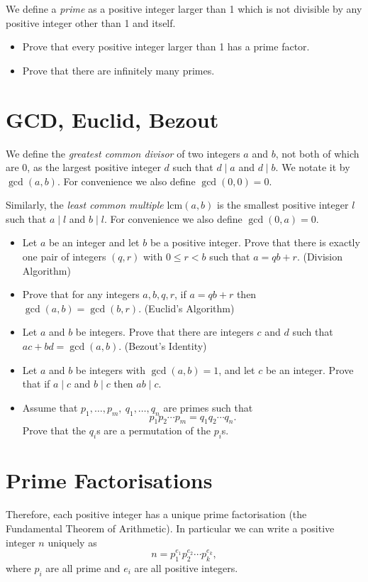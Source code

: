 \documentclass{article}
\begin{document}
We define a \emph{prime} as a positive integer larger than 1 which is not
divisible by any positive integer other than 1 and itself.
\begin{itemize}
	\item Prove that every positive integer larger than 1 has a prime factor.
	\item Prove that there are infinitely many primes.
\end{itemize}
\section{GCD, Euclid, Bezout}
We define the \emph{greatest common divisor} of two integers $a$ and $b$, not
both of which are 0, as the largest positive integer $d$ such that $d\mid a$
and $d\mid b$. We notate it by $\gcd(a,b)$. For convenience we also define
$\gcd(0,0)=0$.

Similarly, the \emph{least common multiple} $\mathrm{lcm}(a,b)$ is the
smallest positive integer $l$ such that $a\mid l$ and $b\mid l$. For
convenience we also define $\gcd(0,a)=0$.
\begin{itemize}
	\item Let $a$ be an integer and let $b$ be a positive integer. Prove that
	      there is exactly one pair of integers $(q,r)$ with $0\le r<b$ such that
	      $a=qb+r$. (Division Algorithm)
	\item Prove that for any integers $a,b,q,r$, if $a=qb+r$ then
	      $\gcd(a,b)=\gcd(b,r)$. (Euclid's Algorithm)
	\item Let $a$ and $b$ be integers. Prove that there are integers $c$ and $d$
	      such that $ac+bd=\gcd(a,b)$. (Bezout's Identity)
	\item Let $a$ and $b$ be integers with $\gcd(a,b)=1$, and let $c$ be an
	      integer. Prove that if $a\mid c$ and $b\mid c$ then $ab\mid c$.
	\item Assume that $p_1,\ldots,p_m,\ q_1,\ldots,q_n$ are primes such that
	      \[p_1p_2\cdots p_m=q_1q_2\cdots q_n.\]
	      Prove that the $q_i$s are a permutation of the $p_i$s.
\end{itemize}
\section{Prime Factorisations}
Therefore, each positive integer has a unique prime factorisation (the
Fundamental Theorem of Arithmetic).
In particular we can write a positive integer $n$ uniquely as
\[n=p_1^{e_1}p_2^{e_2}\cdots p_k^{e_k},\]
where $p_i$ are all prime and $e_i$ are all positive integers.
\end{document}
